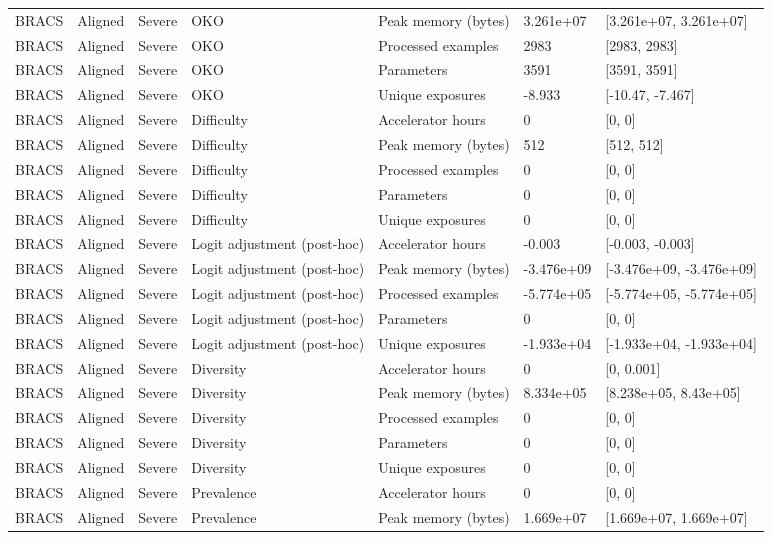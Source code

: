 \begin{longtable}{lllllll}
BRACS & Aligned & Severe & OKO & Peak memory (bytes) & 3.261e+07 & [3.261e+07, 3.261e+07] \\
BRACS & Aligned & Severe & OKO & Processed examples & 2983 & [2983, 2983] \\
BRACS & Aligned & Severe & OKO & Parameters & 3591 & [3591, 3591] \\
BRACS & Aligned & Severe & OKO & Unique exposures & -8.933 & [-10.47, -7.467] \\
BRACS & Aligned & Severe & Difficulty & Accelerator hours & 0 & [0, 0] \\
BRACS & Aligned & Severe & Difficulty & Peak memory (bytes) & 512 & [512, 512] \\
BRACS & Aligned & Severe & Difficulty & Processed examples & 0 & [0, 0] \\
BRACS & Aligned & Severe & Difficulty & Parameters & 0 & [0, 0] \\
BRACS & Aligned & Severe & Difficulty & Unique exposures & 0 & [0, 0] \\
BRACS & Aligned & Severe & Logit adjustment (post-hoc) & Accelerator hours & -0.003 & [-0.003, -0.003] \\
BRACS & Aligned & Severe & Logit adjustment (post-hoc) & Peak memory (bytes) & -3.476e+09 & [-3.476e+09, -3.476e+09] \\
BRACS & Aligned & Severe & Logit adjustment (post-hoc) & Processed examples & -5.774e+05 & [-5.774e+05, -5.774e+05] \\
BRACS & Aligned & Severe & Logit adjustment (post-hoc) & Parameters & 0 & [0, 0] \\
BRACS & Aligned & Severe & Logit adjustment (post-hoc) & Unique exposures & -1.933e+04 & [-1.933e+04, -1.933e+04] \\
BRACS & Aligned & Severe & Diversity & Accelerator hours & 0 & [0, 0.001] \\
BRACS & Aligned & Severe & Diversity & Peak memory (bytes) & 8.334e+05 & [8.238e+05, 8.43e+05] \\
BRACS & Aligned & Severe & Diversity & Processed examples & 0 & [0, 0] \\
BRACS & Aligned & Severe & Diversity & Parameters & 0 & [0, 0] \\
BRACS & Aligned & Severe & Diversity & Unique exposures & 0 & [0, 0] \\
BRACS & Aligned & Severe & Prevalence & Accelerator hours & 0 & [0, 0] \\
BRACS & Aligned & Severe & Prevalence & Peak memory (bytes) & 1.669e+07 & [1.669e+07, 1.669e+07] \\

\end{longtable}
